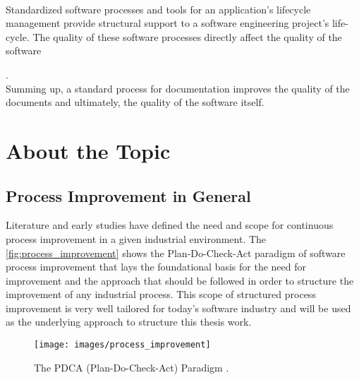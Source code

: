 \\\indent Standardized software processes and tools for an application's lifecycle management provide structural support to a software engineering project's life-cycle. The quality of these software processes directly affect the quality of the software {\cite{Fuggeffa1988}.
\\\indent Summing up, a standard process for documentation improves the quality of the documents and ultimately, the quality of the software itself.

\section{About the Topic}\label{sec:about}
\subsection{Process Improvement in General}
Literature and early studies have defined the need and scope for continuous process improvement in a given industrial environment.
\newline\indent The \autoref{fig:process_improvement} shows the Plan-Do-Check-Act paradigm of software process improvement that lays the foundational basis for the need for improvement and the approach that should be followed in order to structure the improvement of any industrial process. This scope of structured process improvement is very well tailored for today's software industry and will be used as the underlying approach to structure this thesis work.

\begin{figure}[H]
  \centering
  \texttt{[image: images/process\_improvement]}
  \caption[The PDCA (Plan-Do-Check-Act) Paradigm /cite{Gorschek2006}]{The PDCA (Plan-Do-Check-Act) Paradigm \cite{Gorschek2006}.}\label{fig:process_improvement}
\end{figure}

}
